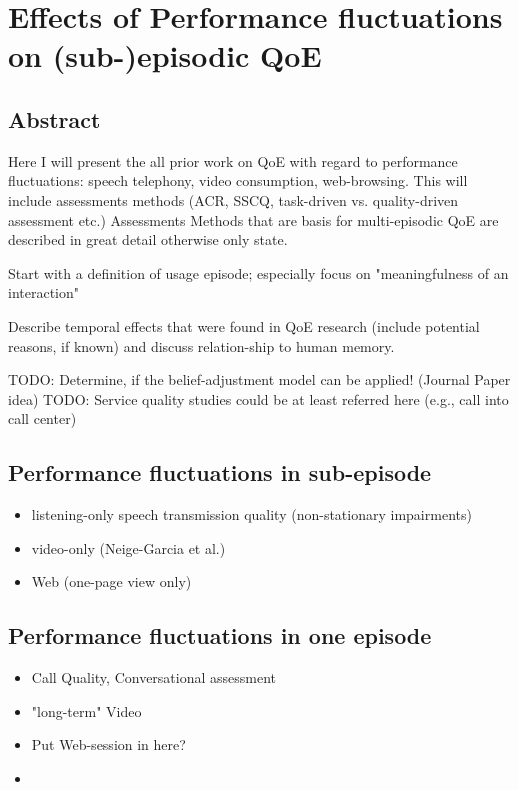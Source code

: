 \chapter{Effects of Performance fluctuations on (sub-)episodic QoE}\label{chap:04}
\section*{Abstract}
Here I will present the all prior work on QoE with regard to performance fluctuations: speech telephony, video consumption, web-browsing.
This will include assessments methods (ACR, SSCQ, task-driven vs. quality-driven assessment etc.)
Assessments Methods that are basis for multi-episodic QoE are described in great detail otherwise only state.

Start with a definition of usage episode; especially focus on "meaningfulness of an interaction"

Describe temporal effects that were found in QoE research (include potential reasons, if known) and discuss relation-ship to human memory.

TODO: Determine, if the belief-adjustment model can be applied! (Journal Paper idea)
TODO: Service quality studies could be at least referred here (e.g., call into call center)

\section{Performance fluctuations in sub-episode}
\begin{itemize}
\item listening-only speech transmission quality (non-stationary impairments)
\item video-only (Neige-Garcia et al.)
\item Web (one-page view only)
\end{itemize}

\section{Performance fluctuations in one episode}
\begin{itemize}
\item Call Quality, Conversational assessment
\item "long-term" Video
\item Put Web-session in here?
\item 
\end{itemize}